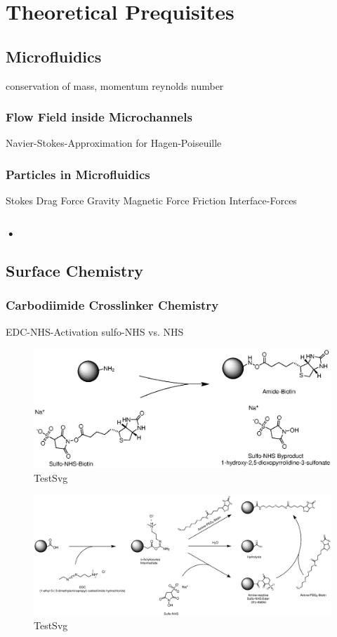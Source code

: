 \chapter{Theoretical Prequisites}

\section{Microfluidics}
conservation of mass, momentum
reynolds number
\subsection{Flow Field inside Microchannels}
Navier-Stokes-Approximation for Hagen-Poiseuille
\subsection{Particles in Microfluidics}
Stokes Drag Force
Gravity
Magnetic Force
Friction
Interface-Forces
\subsection{•}

\section{Surface Chemistry}
\subsection{Carbodiimide Crosslinker Chemistry}
EDC-NHS-Activation
sulfo-NHS vs. NHS
\begin{figure}[hbtp]
\centering
\includegraphics[width=\textwidth]{./Ressources/Chemistry/Sulfo-NHS.eps}
\caption{TestSvg}
\label{fig:Chem:NH2-NHS}
\end{figure}

\begin{figure}[hbtp]
\centering
\includegraphics[width=\textwidth]{./Ressources/Chemistry/EDC-NHS.eps}
\caption{TestSvg}
\label{fig:Chem:COOH-EDC-NHS}
\end{figure}

